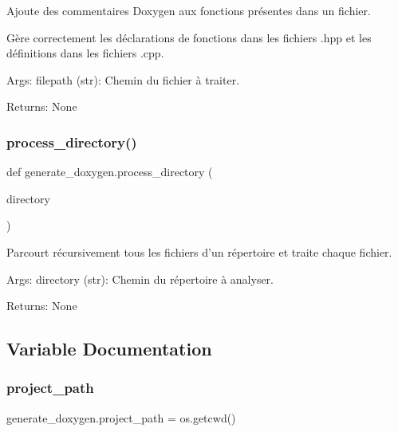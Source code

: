 \begin{DoxyVerb}Ajoute des commentaires Doxygen aux fonctions présentes dans un fichier.

Gère correctement les déclarations de fonctions dans les fichiers .hpp
et les définitions dans les fichiers .cpp.

Args:
    filepath (str): Chemin du fichier à traiter.

Returns:
    None
\end{DoxyVerb}
 \mbox{\label{namespacegenerate__doxygen_a53df88af82d48f4c3745bcb5d0973187}} 
\subsubsection{\texorpdfstring{process\+\_\+directory()}{process\_directory()}}
{\footnotesize\ttfamily def generate\+\_\+doxygen.\+process\+\_\+directory (\begin{DoxyParamCaption}\item[{}]{directory }\end{DoxyParamCaption})}

\begin{DoxyVerb}Parcourt récursivement tous les fichiers d'un répertoire et traite chaque fichier.

Args:
    directory (str): Chemin du répertoire à analyser.

Returns:
    None
\end{DoxyVerb}
 

\subsection{Variable Documentation}
\mbox{\label{namespacegenerate__doxygen_aef24a16e9260486f19bb2aa10574350b}} 
\subsubsection{\texorpdfstring{project\+\_\+path}{project\_path}}
{\footnotesize\ttfamily generate\+\_\+doxygen.\+project\+\_\+path = os.\+getcwd()}

